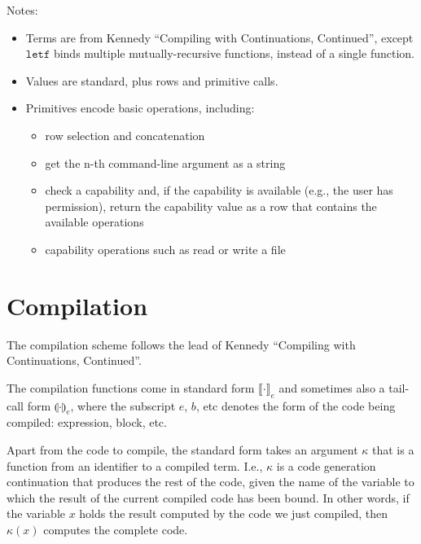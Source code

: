 \documentclass[11pt]{article}
\newcommand{\kw}[1]{\mathtt{#1}}
\begin{document}
Notes:
\begin{itemize}
\item Terms are from Kennedy ``Compiling with Continuations, Continued'', except $\kw{letf}$ binds multiple mutually-recursive functions, instead of a single function.
\item Values are standard, plus rows and primitive calls.
\item Primitives encode basic operations, including:
\begin{itemize}
\item row selection and concatenation
\item get the n-th command-line argument as a string
\item check a capability and, if the capability is available (e.g., the user has permission), return the capability value as a row that contains the available operations
\item capability operations such as read or write a file
\end{itemize}
\end{itemize}

\newpage

\section{Compilation}

\newcommand{\cmp}[2]{\llbracket #2 \rrbracket_#1}
\newcommand{\cmpn}[1]{\cmp{#1}{\cdot}}
\newcommand{\cmpin}[3]{\cmp{#1}{#2}\;#3}
\newcommand{\cmpk}[2]{\cmp{#1}{#2}\;\kappa}

\newcommand{\tcmp}[2]{\llparenthesis #2 \rrparenthesis_#1}
\newcommand{\tcmpn}[1]{\tcmp{#1}{\cdot}}
\newcommand{\tcmpin}[3]{\tcmp{#1}{#2}\;#3}
\newcommand{\tcmpk}[2]{\tcmp{#1}{#2}\;k}

The compilation scheme follows the lead of Kennedy ``Compiling with Continuations, Continued''.

The compilation functions come in standard form $\cmpn{e}$ and sometimes also a tail-call form $\tcmpn{e}$, where the subscript $e$, $b$, etc denotes the form of the code being compiled: expression, block, etc.

Apart from the code to compile, the standard form takes an argument $\kappa$ that is a function from an identifier to a compiled term.
I.e., $\kappa$ is a code generation continuation that produces the rest of the code, given the name of the variable to which the result of the current compiled code has been bound.
In other words, if the variable $x$ holds the result computed by the code we just compiled, then $\kappa(x)$ computes the complete code.
\end{document}
